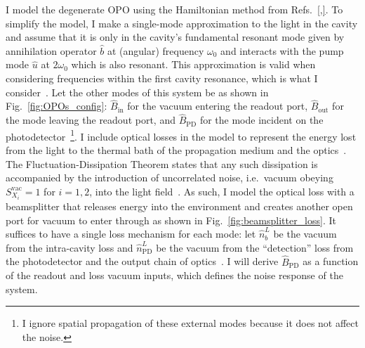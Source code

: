 I model the degenerate OPO using the Hamiltonian method from Refs.~\ref{,}.
To simplify the model, I make a single-mode approximation to the light in the cavity and assume that it is only in the cavity's fundamental resonant mode given by annihilation operator $\hat b$ at (angular) frequency $\omega_0$ and interacts with the pump mode $\hat u$ at $2\omega_0$ which is also resonant. This approximation is valid when considering frequencies within the first cavity resonance, which is what I consider~\cite{}.
Let the other modes of this system be as shown in Fig.~\ref{fig:OPOs_config}: $\hat B_\text{in}$ for the vacuum entering the readout port, $\hat B_\text{out}$ for the mode leaving the readout port, and $\hat B_\text{PD}$ for the mode incident on the photodetector~\footnote{I ignore spatial propagation of these external modes because it does not affect the noise.}.
I include optical losses in the model to represent the energy lost from the light to the thermal bath of the propagation medium and the optics~\cite{}. The Fluctuation-Dissipation Theorem states that any such dissipation is accompanied by the introduction of uncorrelated noise, i.e.\ vacuum obeying $S_{X_i}^\text{vac}=1$ for $i=1,2$, into the light field~\cite{}. As such, I model the optical loss with a beamsplitter that releases energy into the environment and creates another open port for vacuum to enter through as shown in Fig.~\ref{fig:beamsplitter_loss}. It suffices to have a single loss mechanism for each mode: let $\hat n^L_b$ be the vacuum from the intra-cavity loss and $\hat n^L_\text{PD}$ be the vacuum from the ``detection'' loss from the photodetector and the output chain of optics~\cite{}.
I will derive $\hat B_\text{PD}$ as a function of the readout and loss vacuum inputs, which defines the noise response of the system. %

